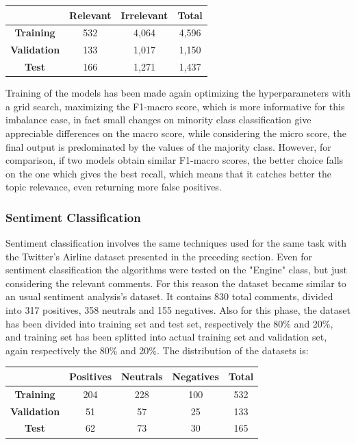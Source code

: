 \begin{center}
	\begin{tabular}{ | c  c  c | c | } 
		\hline
		& \textbf{Relevant} & \textbf{Irrelevant} & \textbf{Total} \\
		\hline
		\textbf{Training} & 532 & 4,064 & 4,596 \\ 
		\hline
		\textbf{Validation} & 133 & 1,017 & 1,150 \\ 
		\hline
		\textbf{Test} & 166 & 1,271 & 1,437\\
		\hline
	\end{tabular}
\end{center}

Training of the models has been made again optimizing the hyperparameters with a grid search, maximizing the F1-macro score, which is more informative for this imbalance case, in fact small changes on minority class classification give appreciable differences on the macro score, while considering the micro score, the final output is predominated by the values of the majority class. However, for comparison, if two models obtain similar F1-macro scores, the better choice falls on the one which gives the best recall, which means that it catches better the topic relevance, even returning more false positives.



\subsubsection{Sentiment Classification}

Sentiment classification involves the same techniques used for the same task with the Twitter's Airline dataset presented in the preceding section. Even for sentiment classification the algorithms were tested on the "Engine" class, but just considering the relevant comments. For this reason the dataset became similar to an usual sentiment analysis's dataset. It contains 830 total comments, divided into 317 positives, 358 neutrals and 155 negatives. Also for this phase, the dataset has been divided into training set and test set, respectively the 80\% and 20\%, and training set has been splitted into actual training set and validation set, again respectively the 80\% and 20\%. The distribution of the datasets is:

\begin{center}
	\begin{tabular}{ | c  c  c c | c | } 
		\hline
		& \textbf{Positives} & \textbf{Neutrals} & \textbf{Negatives} & \textbf{Total} \\
		\hline
		\textbf{Training} & 204 & 228 & 100 & 532 \\ 
		\hline
		\textbf{Validation} & 51 & 57 & 25 & 133 \\ 
		\hline
		\textbf{Test} & 62 & 73 & 30 & 165 \\
		\hline
	\end{tabular}
\end{center}


